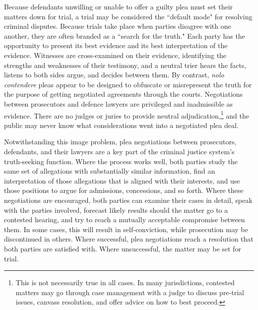 Because defendants unwilling or unable to offer a guilty plea must set their matters down for trial, a trial may be considered the ``default mode" for resolving criminal disputes. Because trials take place when parties disagree with one another, they are often branded as a ``search for the truth." Each party has the opportunity to present its best evidence and its best interpretation of the evidence. Witnesses are cross-examined on their evidence, identifying the strengths and weaknesses of their testimony, and a neutral trier hears the facts, listens to both sides argue, and decides between them. By contrast, \textit{nolo contendere} pleas appear to be designed to obfuscate or misrepresent the truth for the purpose of getting negotiated agreements through the courts. Negotiations between prosecutors and defence lawyers are privileged and inadmissible as evidence. There are no judges or juries to provide neutral adjudication,\footnote{This is not necessarily true in all cases. In many jurisdictions, contested matters may go through case management with a judge to discuss pre-trial issues, canvass resolution, and offer advice on how to best proceed.} and the public may never know what considerations went into a negotiated plea deal. 

Notwithstanding this image problem, plea negotiations between prosecutors, defendants, and their lawyers are a key part of the criminal justice system's truth-seeking function. Where the process works well, both parties study the same set of allegations with substantially similar information, find an interpretation of those allegations that is aligned with their interests, and use those positions to argue for admissions, concessions, and so forth. Where these negotiations are encouraged, both parties can examine their cases in detail, speak with the parties involved, forecast likely results should the matter go to a contested hearing, and try to reach a mutually acceptable compromise between them. In some cases, this will result in self-conviction, while prosecution may be discontinued in others. Where successful, plea negotiations reach a resolution that both parties are satisfied with. Where unsuccessful, the matter may be set for trial.

